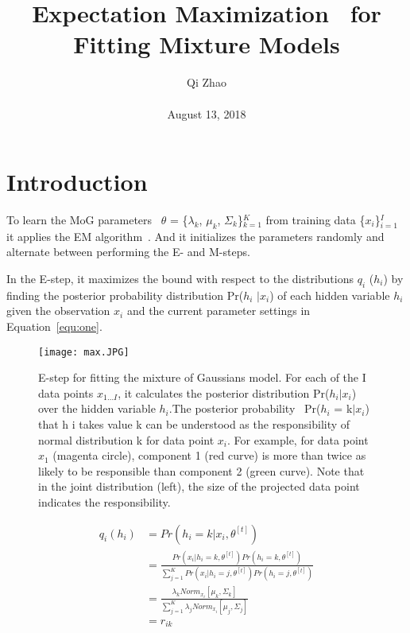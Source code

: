 \documentclass[10pt,twocolumn,letterpaper]{article}
\begin{document}
\title{Expectation Maximization~\cite{Moon2000The} for Fitting Mixture Models}
\author{Qi Zhao\\\\August 13, 2018}

\maketitle
\section{Introduction}
To learn the MoG parameters~\cite{roy2013dynamic} $\theta$ = \{$\lambda_k$, $\mu_k$, $\Sigma_k$\}$^K_{k=1}$ from training data \{$x_i$\}$^I_{i=1}$ it applies the EM algorithm~\cite{Wu1983On}. And it initializes the parameters randomly and alternate between performing the E- and M-steps.

 In the E-step, it maximizes the bound with respect to the distributions $q_i$ ($h_i$) by finding the posterior probability distribution Pr($h_i$ $|$$x_i$) of each hidden variable $h_i$ given the observation $x_i$ and the current parameter settings in Equation~\ref{equ:one}.
\begin{figure}[H]
\centering
\texttt{[image: max.JPG]}
 \caption{ E-step for fitting the mixture of Gaussians model. For each of the I data points $x_{1...I}$, it calculates the posterior distribution Pr($h_i$$|$$x_i$) over the hidden variable $h_i$.The posterior probability~\cite{Erixon2003Reliability} Pr($h_i$ = k$|$$x_i$) that h i takes value k can be understood as the responsibility of normal distribution k for data point $x_i$. For example, for data point $x_1$ (magenta circle), component 1 (red curve) is more than twice as likely to be responsible than component 2 (green curve). Note that in the joint distribution (left), the size of the projected data point indicates the responsibility.}
\label{fig:onecol}
\end{figure}
\begin{equation}
\begin{split}
q_i(h_i) &= Pr(h_i = k|x_i, \theta^{[t]}) \\
& = \frac{Pr(x_i|h_i = k, \theta^{[t]})Pr(h_i = k, \theta^{[t]})}{\sum_{j = 1}^KPr(x_i|h_i = j, \theta^{[t]})Pr(h_i = j, \theta^{[t]})} \\
& = \frac{\lambda_kNorm_{x_i}[\mu_k, \Sigma_k]}{\sum_{j = 1}^K\lambda_jNorm_{x_i}[\mu_j, \Sigma_j]}\\
& = r_{ik}
\end{split}
\label{equ:one}
\end{equation}
\end{document}

